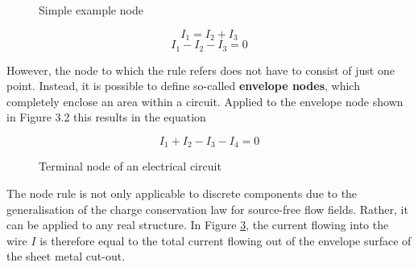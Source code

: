 \begin{frame}
{		
		\begin{figure}[h!]
			\renewcommand{\figurename}{Figure}
			\centering
			{}
			
			{\caption{Simple example node}}
			\label{fig:knoten}
		\end{figure}
		
		
		
		
		
		\begin{equation*}
			I_1 = I_2 + I_3
		\end{equation*}
		\begin{equation*}
			I_1 - I_2 - I_3 = 0
		\end{equation*}
		
		However, the node to which the rule refers does not have to consist of just one point.
		Instead, it is possible to define so-called \textbf{envelope nodes}, which completely enclose an area
		within a circuit.
		Applied to the envelope node shown in Figure 3.2
		this results in the equation
		
		\begin{equation*}
			I_1 + I_2 - I_3 - I_4 = 0
		\end{equation*}
		
		
		\begin{figure}[h!]
			\renewcommand{\figurename}{Figure}
			\begin{center}
				
			\end{center}
			\label{fig:knoten2}
			\caption{Terminal node of an electrical circuit}
		\end{figure}
		
		The node rule is not only applicable to discrete components due to the generalisation of the charge conservation law for source-free
		flow fields. Rather, it can be applied to any real
		structure. In Figure \ref{fig:huell}, the current flowing into the wire
        $I$ is therefore equal to the total current flowing out of the envelope surface of the sheet metal cut-out.
		
		
		
		\begin{figure}[h!]
			\renewcommand{\figurename}{Figure}
			\centering
			\s{}
			
			\label{fig:huell}
		\end{figure}
		
}
\end{frame}
